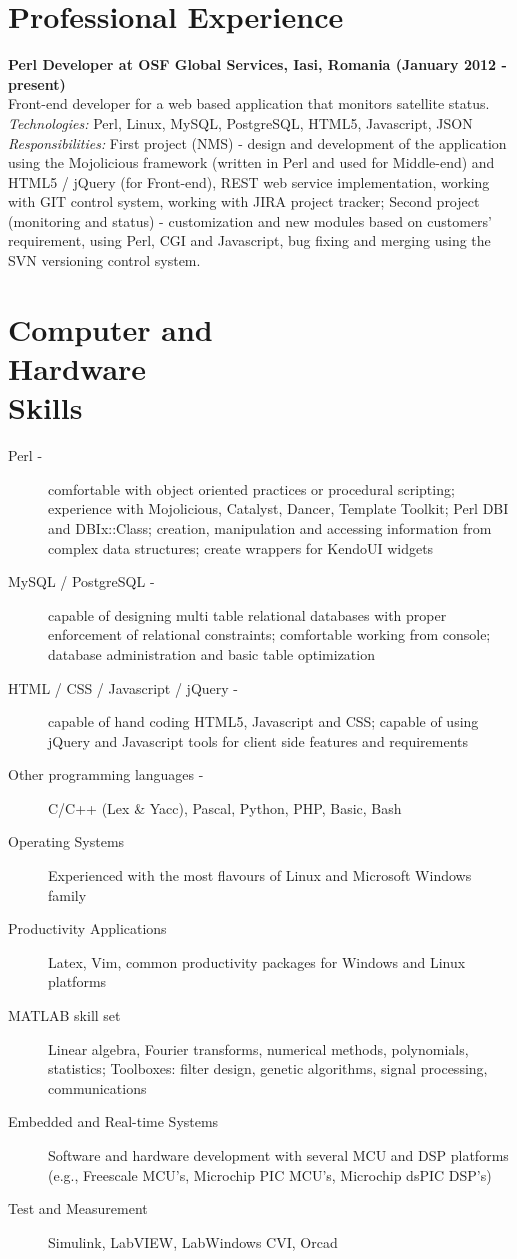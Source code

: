 \documentclass[margin,line,a4paper]{resume}
\begin{document}
\begin{resume}
\section{\mysidestyle Professional Experience}
	\textbf{Perl Developer at OSF Global Services, Iasi, Romania (January 2012 - present)}\\
	Front-end developer for a web based application that monitors satellite status.\\
	\textit{Technologies: }Perl, Linux, MySQL, PostgreSQL, HTML5, Javascript, JSON\\
	\textit{Responsibilities: }First project (NMS) - design and development of the application using the Mojolicious framework (written in Perl and used for Middle-end) and HTML5 / jQuery (for Front-end), REST web service implementation, working with GIT control system, working with JIRA project tracker; Second project (monitoring and status) - customization and new modules based on customers' requirement, using Perl, CGI and Javascript, bug fixing and merging using the SVN versioning control system.

\section{\mysidestyle Computer and\\Hardware\\Skills}
	\begin{description}
		\item[Perl -] comfortable with object oriented practices or procedural scripting; experience with Mojolicious, Catalyst, Dancer, Template Toolkit; Perl DBI and DBIx::Class; creation, manipulation and accessing information from
complex data structures; create wrappers for KendoUI widgets
		\item[MySQL / PostgreSQL -] capable of designing multi table relational
databases with proper enforcement of relational constraints; comfortable
working from console; database administration and basic table optimization
		\item[HTML / CSS / Javascript / jQuery -] capable of hand coding HTML5,
Javascript and CSS; capable of using jQuery and Javascript tools for client
side features and requirements
		\item[Other programming languages -] C/C++ (Lex \& Yacc), Pascal, Python, PHP, Basic, Bash
		\item[Operating Systems] Experienced with the most flavours of Linux and Microsoft Windows family
		\item[Productivity Applications] Latex, Vim, common productivity packages for Windows and Linux platforms
		\item[MATLAB skill set] Linear algebra, Fourier transforms, numerical methods, polynomials, statistics; Toolboxes: filter design, genetic algorithms, signal processing, communications
		\item[Embedded and Real-time Systems] Software and hardware development with several MCU and DSP platforms (e.g., Freescale MCU's, Microchip PIC MCU's, Microchip dsPIC DSP's)
		\item[Test and Measurement] Simulink, LabVIEW, LabWindows CVI, Orcad
	

\end{description}
\end{resume}
\end{document}
